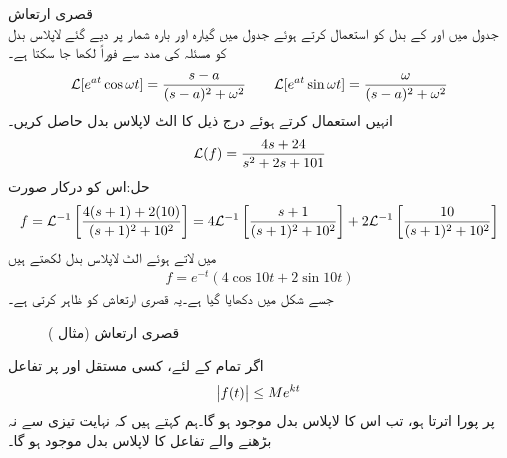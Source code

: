 \quad قصری ارتعاش\\
جدول  میں  اور  کے بدل کو استعمال کرتے ہوئے جدول میں گیارہ اور بارہ شمار پر دیے گئے لاپلاس بدل کو مسئلہ  کی مدد سے فوراً لکھا جا سکتا ہے۔
\begin{align*}
\mathcal{L}[e^{at}\cos \omega t]=\frac{s-a}{(s-a)^2+\omega^2} \quad \quad \mathcal{L}[e^{at}\sin \omega t]=\frac{\omega}{(s-a)^2+\omega^2}
\end{align*}
انہیں استعمال کرتے ہوئے درج ذیل کا الٹ لاپلاس بدل حاصل کریں۔
\begin{align*}
\mathcal{L}(f)=\frac{4s+24}{s^2+2s+101}
\end{align*}
حل:اس کو درکار صورت
\begin{align*}
f=\mathcal{L}^{-1}\left[\frac{4(s+1)+2(10)}{(s+1)^2+10^2}\right]=4\mathcal{L}^{-1}\left[\frac{s+1}{(s+1)^2+10^2}\right]+2\mathcal{L}^{-1}\left[\frac{10}{(s+1)^2+10^2}\right]
\end{align*}
 میں لاتے ہوئے الٹ لاپلاس بدل لکھتے ہیں
\begin{align*}
f=e^{-t}(4\cos 10t+2\sin 10t)
\end{align*}
 جسے شکل  میں دکھایا گیا ہے۔یہ قصری ارتعاش کو ظاہر کرتی ہے۔
\begin{figure}
\centering
{}
\caption{قصری ارتعاش (مثال )}
\label{شکل_لاپلاس_قصری_ارتعاش}
\end{figure}

اگر تمام   کے لئے، کسی مستقل  اور  پر تفاعل  
\begin{align}\label{مساوات_لاپلاس_بڑھنے_کی_حد}
\abs{f(t)} \le M e^{kt}
\end{align}
پر پورا اترتا ہو، تب اس کا لاپلاس بدل موجود ہو گا۔ہم کہتے ہیں کہ نہایت تیزی سے نہ بڑھنے والے  تفاعل  کا لاپلاس بدل موجود ہو گا۔

